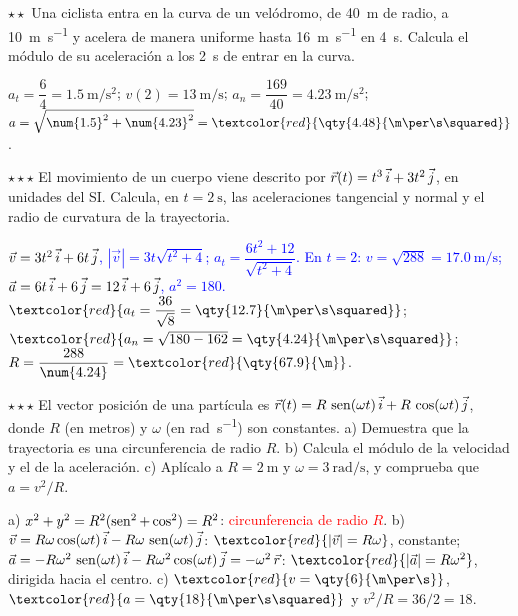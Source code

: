 \begin{exercise}
    \(\star\star\) Una ciclista entra en la curva de un velódromo, de \qty{40}{\m} de radio, a \qty{10}{\m\per\s} y acelera de
    manera uniforme hasta \qty{16}{\m\per\s} en \qty{4}{\s}. Calcula el módulo de su aceleración a los \qty{2}{\s} de entrar en la
    curva.
    \begin{solu}
        \(a_t = \dfrac{6}{4} = \qty{1.5}{\m\per\s\squared}\); \(v(2) = \qty{13}{\m\per\s}\); \(a_n = \dfrac{169}{40} = \qty{4.23}{\m\per\s\squared}\);
        \(a = \sqrt{\num{1.5}^2 + \num{4.23}^2} = \textcolor{red}{\qty{4.48}{\m\per\s\squared}}\).
    \end{solu}
\end{exercise}

\begin{exercise}
    \(\star\star\star\) El movimiento de un cuerpo viene descrito por \(\vec r(t) = t^3\,\vec{i} + 3t^2\,\vec{j}\), en unidades del SI.
    Calcula, en \(t = \qty{2}{\s}\), las aceleraciones tangencial y normal y el radio de curvatura de la trayectoria.
    \begin{solu}
        \textcolor{blue}{\(\vec v = 3t^2\,\vec{i} + 6t\,\vec{j}\), \(|\vec v| = 3t\sqrt{t^2 + 4}\); \(a_t = \dfrac{6t^2 + 12}{\sqrt{t^2 + 4}}\).
        En \(t = 2\): \(v = \sqrt{288} = \qty{17.0}{\m\per\s}\); \(\vec a = 6t\,\vec{i} + 6\,\vec{j} = 12\,\vec{i} + 6\,\vec{j}\), \(a^2 = 180\).}
        \(\textcolor{red}{a_t = \dfrac{36}{\sqrt 8} = \qty{12.7}{\m\per\s\squared}}\); \(\textcolor{red}{a_n = \sqrt{180 - 162} = \qty{4.24}{\m\per\s\squared}}\);
        \(R = \dfrac{288}{\num{4.24}} = \textcolor{red}{\qty{67.9}{\m}}\).
    \end{solu}
\end{exercise}

\begin{exercise}
    \(\star\star\star\) El vector posición de una partícula es \(\vec r(t) = R\,\operatorname{sen}(\omega t)\,\vec{i} + R\,\cos(\omega t)\,\vec{j}\),
    donde \(R\) (en metros) y \(\omega\) (en \unit{\radian\per\s}) son constantes. a) Demuestra que la trayectoria es una
    circunferencia de radio \(R\). b) Calcula el módulo de la velocidad y el de la aceleración. c) Aplícalo a \(R = \qty{2}{\m}\) y
    \(\omega = \qty{3}{\radian\per\s}\), y comprueba que \(a = v^2/R\).
    \begin{solu}
        a) \(x^2 + y^2 = R^2(\operatorname{sen}^2 + \cos^2) = R^2\): \textcolor{red}{circunferencia de radio \(R\)}.
        b) \(\vec v = R\omega\cos(\omega t)\,\vec{i} - R\omega\,\operatorname{sen}(\omega t)\,\vec{j}\): \(\textcolor{red}{|\vec v| = R\omega}\), constante;
        \(\vec a = -R\omega^2\,\operatorname{sen}(\omega t)\,\vec{i} - R\omega^2\cos(\omega t)\,\vec{j} = -\omega^2\,\vec r\): \(\textcolor{red}{|\vec a| = R\omega^2}\),
        dirigida hacia el centro. c) \(\textcolor{red}{v = \qty{6}{\m\per\s}}\), \(\textcolor{red}{a = \qty{18}{\m\per\s\squared}}\) y
        \(v^2/R = 36/2 = 18\).
    \end{solu}
\end{exercise}

